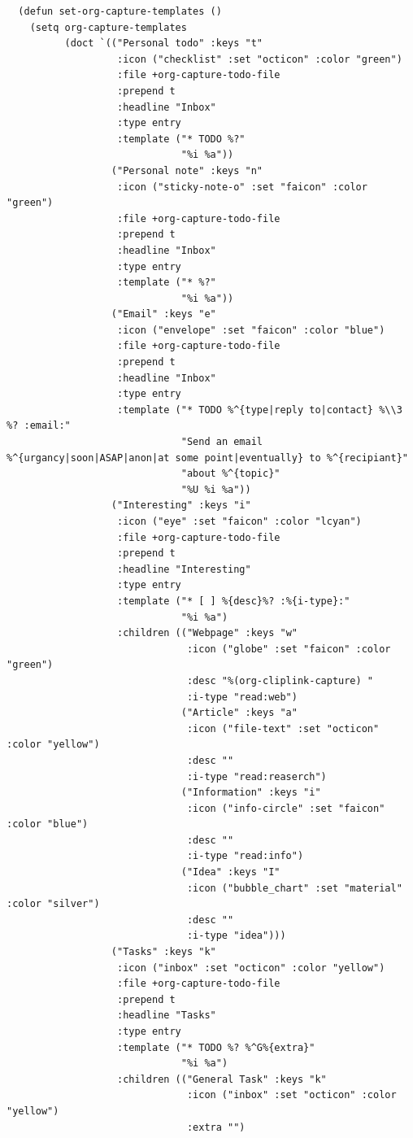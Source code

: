 \documentclass[11pt]{article}
\begin{document}
\begin{verbatim}
  (defun set-org-capture-templates ()
    (setq org-capture-templates
          (doct `(("Personal todo" :keys "t"
                   :icon ("checklist" :set "octicon" :color "green")
                   :file +org-capture-todo-file
                   :prepend t
                   :headline "Inbox"
                   :type entry
                   :template ("* TODO %?"
                              "%i %a"))
                  ("Personal note" :keys "n"
                   :icon ("sticky-note-o" :set "faicon" :color "green")
                   :file +org-capture-todo-file
                   :prepend t
                   :headline "Inbox"
                   :type entry
                   :template ("* %?"
                              "%i %a"))
                  ("Email" :keys "e"
                   :icon ("envelope" :set "faicon" :color "blue")
                   :file +org-capture-todo-file
                   :prepend t
                   :headline "Inbox"
                   :type entry
                   :template ("* TODO %^{type|reply to|contact} %\\3 %? :email:"
                              "Send an email %^{urgancy|soon|ASAP|anon|at some point|eventually} to %^{recipiant}"
                              "about %^{topic}"
                              "%U %i %a"))
                  ("Interesting" :keys "i"
                   :icon ("eye" :set "faicon" :color "lcyan")
                   :file +org-capture-todo-file
                   :prepend t
                   :headline "Interesting"
                   :type entry
                   :template ("* [ ] %{desc}%? :%{i-type}:"
                              "%i %a")
                   :children (("Webpage" :keys "w"
                               :icon ("globe" :set "faicon" :color "green")
                               :desc "%(org-cliplink-capture) "
                               :i-type "read:web")
                              ("Article" :keys "a"
                               :icon ("file-text" :set "octicon" :color "yellow")
                               :desc ""
                               :i-type "read:reaserch")
                              ("Information" :keys "i"
                               :icon ("info-circle" :set "faicon" :color "blue")
                               :desc ""
                               :i-type "read:info")
                              ("Idea" :keys "I"
                               :icon ("bubble_chart" :set "material" :color "silver")
                               :desc ""
                               :i-type "idea")))
                  ("Tasks" :keys "k"
                   :icon ("inbox" :set "octicon" :color "yellow")
                   :file +org-capture-todo-file
                   :prepend t
                   :headline "Tasks"
                   :type entry
                   :template ("* TODO %? %^G%{extra}"
                              "%i %a")
                   :children (("General Task" :keys "k"
                               :icon ("inbox" :set "octicon" :color "yellow")
                               :extra "")


\end{verbatim}
\end{document}
